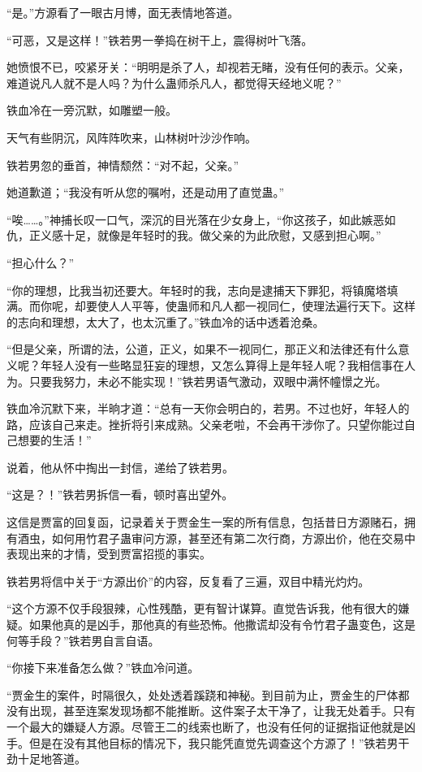 \begin{this_body}
“是。”方源看了一眼古月博，面无表情地答道。

“可恶，又是这样！”铁若男一拳捣在树干上，震得树叶飞落。

她愤恨不已，咬紧牙关：“明明是杀了人，却视若无睹，没有任何的表示。父亲，难道说凡人就不是人吗？为什么蛊师杀凡人，都觉得天经地义呢？”

铁血冷在一旁沉默，如雕塑一般。

天气有些阴沉，风阵阵吹来，山林树叶沙沙作响。

铁若男忽的垂首，神情颓然：“对不起，父亲。”

她道歉道；“我没有听从您的嘱咐，还是动用了直觉蛊。”

“唉……。”神捕长叹一口气，深沉的目光落在少女身上，“你这孩子，如此嫉恶如仇，正义感十足，就像是年轻时的我。做父亲的为此欣慰，又感到担心啊。”

“担心什么？”

“你的理想，比我当初还要大。年轻时的我，志向是逮捕天下罪犯，将镇魔塔填满。而你呢，却要使人人平等，使蛊师和凡人都一视同仁，使理法遍行天下。这样的志向和理想，太大了，也太沉重了。”铁血冷的话中透着沧桑。

“但是父亲，所谓的法，公道，正义，如果不一视同仁，那正义和法律还有什么意义呢？年轻人没有一些略显狂妄的理想，又怎么算得上是年轻人呢？我相信事在人为。只要我努力，未必不能实现！”铁若男语气激动，双眼中满怀幢憬之光。

铁血冷沉默下来，半晌才道：“总有一天你会明白的，若男。不过也好，年轻人的路，应该自己来走。挫折将引来成熟。父亲老啦，不会再干涉你了。只望你能过自己想要的生活！”

说着，他从怀中掏出一封信，递给了铁若男。

“这是？！”铁若男拆信一看，顿时喜出望外。

这信是贾富的回复函，记录着关于贾金生一案的所有信息，包括昔日方源赌石，拥有酒虫，如何用竹君子蛊审问方源，甚至还有第二次行商，方源出价，他在交易中表现出来的才情，受到贾富招揽的事实。

铁若男将信中关于“方源出价”的内容，反复看了三遍，双目中精光灼灼。

“这个方源不仅手段狠辣，心性残酷，更有智计谋算。直觉告诉我，他有很大的嫌疑。如果他真的是凶手，那他真的有些恐怖。他撒谎却没有令竹君子蛊变色，这是何等手段？”铁若男自言自语。

“你接下来准备怎么做？”铁血冷问道。

“贾金生的案件，时隔很久，处处透着蹊跷和神秘。到目前为止，贾金生的尸体都没有出现，甚至连案发现场都不能推断。这件案子太干净了，让我无处着手。只有一个最大的嫌疑人方源。尽管王二的线索也断了，也没有任何的证据指证他就是凶手。但是在没有其他目标的情况下，我只能凭直觉先调查这个方源了！”铁若男干劲十足地答道。


\end{this_body}
